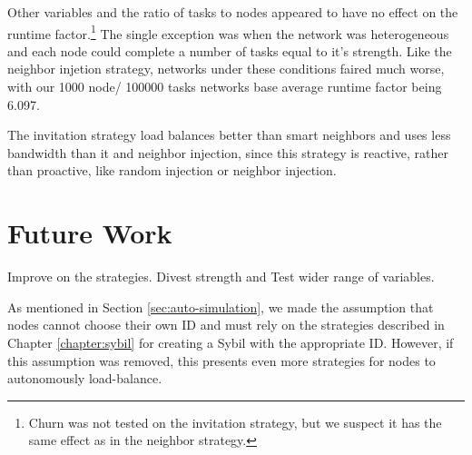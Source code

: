 Other variables and the ratio of tasks to nodes appeared to have no effect on the runtime factor.\footnote{Churn was not tested on the invitation strategy, but we suspect it has the same effect as in the neighbor strategy.}
The single exception was when the network was heterogeneous and each node could complete a number of tasks equal to it's strength.
Like the neighbor injetion strategy, networks under these conditions faired much worse, with our 1000 node/ 100000 tasks networks base average runtime factor being 6.097.

The invitation strategy load balances better than smart neighbors and uses less bandwidth than it and neighbor injection, since this strategy is reactive, rather than proactive, like random injection or neighbor injection.

\section{Future Work}

Improve on the strategies.
Divest strength and 
Test wider range of variables.

As mentioned in Section \ref{sec:auto-simulation}, we made the assumption that nodes cannot choose their own ID and must rely on the strategies described in Chapter \ref{chapter:sybil}  \cite{sybil-analysis} for creating a Sybil with the appropriate ID.
However, if this assumption was removed, this presents even more strategies for nodes to autonomously load-balance.
